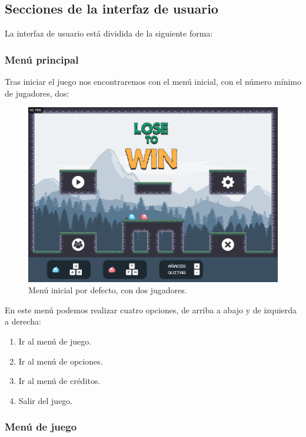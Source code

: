 \documentclass[12pt, spanish]{article}
\begin{document}
\subsection{Secciones de la interfaz de usuario}

La interfaz de usuario está dividida de la siguiente forma:

\subsubsection{Menú principal}

Tras iniciar el juego nos encontraremos con el menú inicial, con el número mínimo de jugadores, dos:

\begin{figure}[H]
  \centering
	\includegraphics[width=\textwidth]{"interfaz/modo_inicial_defecto.png"}
  \caption{Menú inicial por defecto, con dos jugadores.}\label{figure:modo_inicial_defecto}
\end{figure}

En este menú podemos realizar cuatro opciones, de arriba a abajo y de izquierda a derecha:

\begin{enumerate}
	\item Ir al menú de juego.
	\item Ir al menú de opciones.
	\item Ir al menú de créditos.
	\item Salir del juego.
\end{enumerate}

\subsubsection{Menú de juego}
\end{document}
